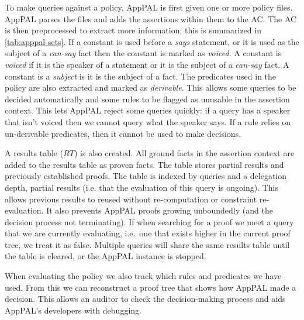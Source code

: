 \documentclass[thesis.tex]{subfiles}
\begin{document}
To make queries against a policy, AppPAL is first given one or more policy files.
AppPAL parses the files and adds the assertions within them to the \ac{AC}. The
AC is then preprocessed to extract more information; this is summarized in
\autoref{tab:apppal-sets}. If a constant is used before a \emph{says} statement,
or it is used as the subject of a \emph{can-say} fact then the constant is
marked as \emph{voiced}. A constant is \emph{voiced} if it is the speaker of a
statement or it is the subject of a \emph{can-say} fact. A constant is a
\emph{subject} is it is the subject of a fact. The predicates used in the policy
are also extracted and marked as \emph{derivable}. This allows some queries to
be decided automatically and some rules to be flagged as unusable in the
assertion context. This lets AppPAL reject some queries quickly: if a query has
a speaker that isn't voiced then we cannot query what the speaker says. If a
rule relies on un-derivable predicates, then it cannot be used to make decisions.

A results table ($RT$) is also created. All ground facts in the assertion context are
added to the results table as proven facts. The table stores partial results and
previously established proofs. The table is indexed by queries and a delegation
depth, partial results (i.e. that the evaluation of this query is ongoing). This
allows previous results to reused without re-computation or constraint
re-evaluation. It also prevents AppPAL proofs growing unboundedly (and the
decision process not terminating). If when searching for a proof we meet a query
that we are currently evaluating, i.e.~one that exists higher in the current
proof tree, we treat it as false. Multiple queries will share the same results
table until the table is cleared, or the AppPAL instance is stopped.

When evaluating the policy we also track which rules and predicates we have
used. From this we can reconstruct a proof tree that shows how AppPAL made a
decision. This allows an auditor to check the decision-making process and aids
AppPAL's developers with debugging.
\end{document}
